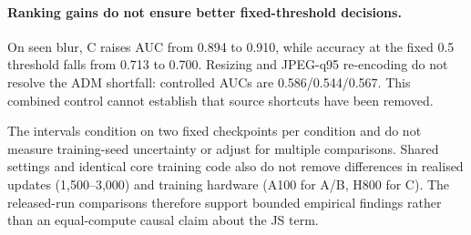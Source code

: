 \paragraph{Ranking gains do not ensure better fixed-threshold decisions.}
On seen blur, C raises AUC from 0.894 to 0.910, while accuracy at the
fixed 0.5 threshold falls from 0.713 to 0.700. Resizing and JPEG-q95
re-encoding do not resolve the ADM shortfall: controlled AUCs are
0.586/0.544/0.567. This combined control cannot establish that source
shortcuts have been removed.

The intervals condition on two fixed checkpoints per condition and do
not measure training-seed uncertainty or adjust for multiple comparisons.
Shared settings and identical core training code also do not remove
differences in realised updates (1,500--3,000) and training hardware
(A100 for A/B, H800 for C). The released-run comparisons therefore
support bounded empirical findings rather than an equal-compute causal
claim about the JS term.
